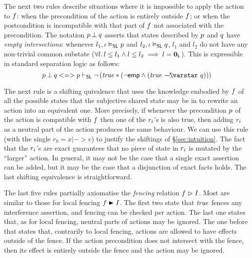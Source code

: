 The next two rules describe situations where  it is impossible to apply the
action to $\lass{F}$: when the precondition  of the action is
entirely outside  $\lass{F}$; or when the postcondition is
incompatible  with that part of  $\lass{F} $ not associated with the
precondition. 
The notation $\separate{\lass{P}}{\lass{Q}}$ asserts that
states described by $\lass{P}$ and $\lass{Q}$ have \emph{empty
  intersections}: whenever $l_1, \lenv \slsat \lass{P}$ and $l_2,
\lenv \slsat \lass{Q}$, $l_1$ and $l_2$ do not have any non-trivial
common substate ($\forall l.\, l \leq l_1 \land l \leq l_2 \implies l =
\mathbf{0}_{\mathsf{L}}$). This is expressible in standard separation logic as follows:
\[
\separate{\lass{P}}{\lass{Q}} <=> \lass{P} \slentails \neg\left( \m{true} * (\neg\emp \land (\m{true} \septraction \lass{Q}) ) \right)
\]

The next rule is a shifting quivalence that uses the
knowledge embodied by $\lass{F}$ of all the possible states that the
subjective shared state may be in to rewrite an action into an
equivalent one. More precisely, if whenever the precondition
$\lass{P}$ of the action is compatible with $\lass{F}$ then one of the
$\lass{R}_i$'s is also true, then adding $\lass{R}_i$ as a neutral
part of the action produces the same behaviour. We can use this rule
(with the single $r_0 = x|->v$) to justify the shiftings of
\S\ref{sec:intuition}. The fact that the $\lass{R}_i$'s are exact
guarantees that no piece of state in $\lass{R}_i$ is mutated by the
``larger'' action.  In general, it may not be the case that a
single exact assertion can be added, but it may be the case that a
disjunction of exact facts holds. The last shifting equivalence is
straightforward.

The last five rules partially axiomatise the \emph{fencing} relation
 $\lass{F}\fences I$. Most are similar to those for local
fencing  $\lass{F}\strictfences I$. The first two state that
$\mathit{true}$ fences any interference assertion, and fencing can be
checked per action. The last one states that, as for local fencing,
neutral parts of actions may be ignored. The one before that states
that, contrarily to local fencing, actions are allowed to have effects
outside of the fence. If the action precondition does not intersect
with the fence, then its effect is entirely outside the fence and
the action may be ignored.

